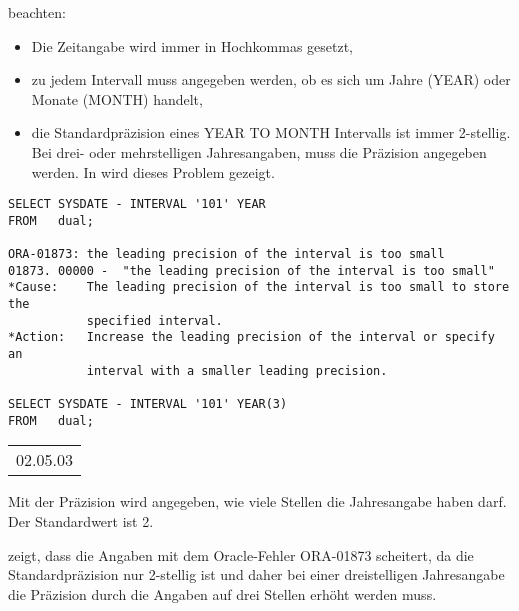            beachten:
          \begin{itemize}
            \item Die Zeitangabe wird immer in Hochkommas gesetzt,
            \item zu jedem Intervall muss angegeben werden, ob es sich um Jahre (YEAR) oder Monate (MONTH) handelt,
            \item die Standardpräzision eines YEAR TO MONTH Intervalls ist immer 2-stellig. Bei drei- oder mehrstelligen Jahresangaben, muss die Präzision angegeben werden. In  wird dieses Problem gezeigt.
          \end{itemize}
          \begin{lstlisting}[language=oracle_sql,caption={Richtiger Umgang mit YEAR TO MONTH Intervallen},label=sql03_20]
SELECT SYSDATE - INTERVAL '101' YEAR
FROM   dual;

ORA-01873: the leading precision of the interval is too small 
01873. 00000 -  "the leading precision of the interval is too small"
*Cause:    The leading precision of the interval is too small to store the
           specified interval.
*Action:   Increase the leading precision of the interval or specify an
           interval with a smaller leading precision.

SELECT SYSDATE - INTERVAL '101' YEAR(3)
FROM   dual;
          \end{lstlisting}
\clearpage
          \begin{center}
            \begin{small}
              \tablehead{}
              \begin{oraclesql}
                \begin{supertabular}{l}
                  02.05.03 \\
                \end{supertabular}
              \end{oraclesql}
            \end{small}
          \end{center}
          \begin{merke}
            Mit der Präzision wird angegeben, wie viele Stellen die
            Jahresangabe haben darf. Der Standardwert ist 2.
          \end{merke}
           zeigt, dass die Angaben  mit dem Oracle-Fehler ORA-01873 scheitert, da die
          Standardpräzision nur 2-stellig ist und daher bei einer
          dreistelligen Jahresangabe die Präzision durch die Angaben
           auf drei Stellen erhöht werden muss.

